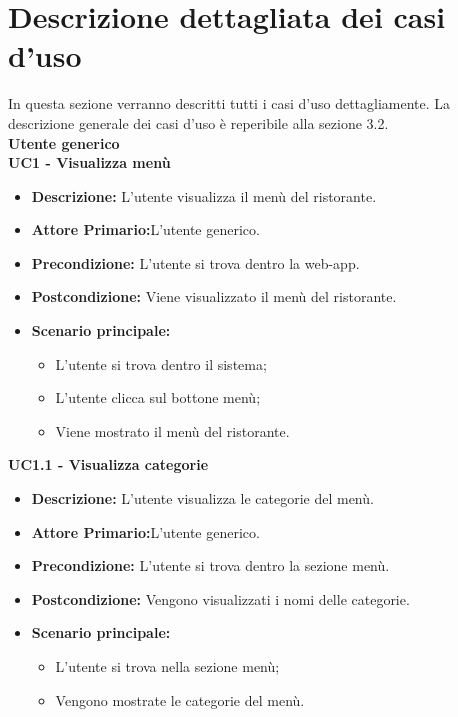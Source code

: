 
\chapter{Descrizione dettagliata dei casi d'uso}
\label{cap:appendice a}
In questa sezione verranno descritti tutti i casi d'uso dettagliamente.
La descrizione generale dei casi d'uso è reperibile alla sezione 3.2.\\

\textbf{Utente generico}\\
\textbf{UC1 - Visualizza menù}
\begin{itemize}
    \item \textbf{Descrizione:} L'utente visualizza il menù del ristorante.
    \item \textbf{Attore Primario:}L'utente generico.
    \item \textbf{Precondizione:} L'utente si trova dentro la web-app.
    \item \textbf{Postcondizione:} Viene visualizzato il menù del ristorante.
    \item \textbf{Scenario principale:}
    \begin{itemize}
        \item L'utente si trova dentro il sistema;
        \item L'utente clicca sul bottone menù;
        \item Viene mostrato il menù del ristorante.
    \end{itemize}
\end{itemize}
\textbf{UC1.1 - Visualizza categorie}
\begin{itemize}
    \item \textbf{Descrizione:} L'utente visualizza le categorie del menù.
    \item \textbf{Attore Primario:}L'utente generico.
    \item \textbf{Precondizione:} L'utente si trova dentro la sezione menù.
    \item \textbf{Postcondizione:} Vengono visualizzati i nomi delle categorie.
    \item \textbf{Scenario principale:}
    \begin{itemize}
        \item L'utente si trova nella sezione menù;
        \item Vengono mostrate le categorie del menù.
    \end{itemize}
\end{itemize}
